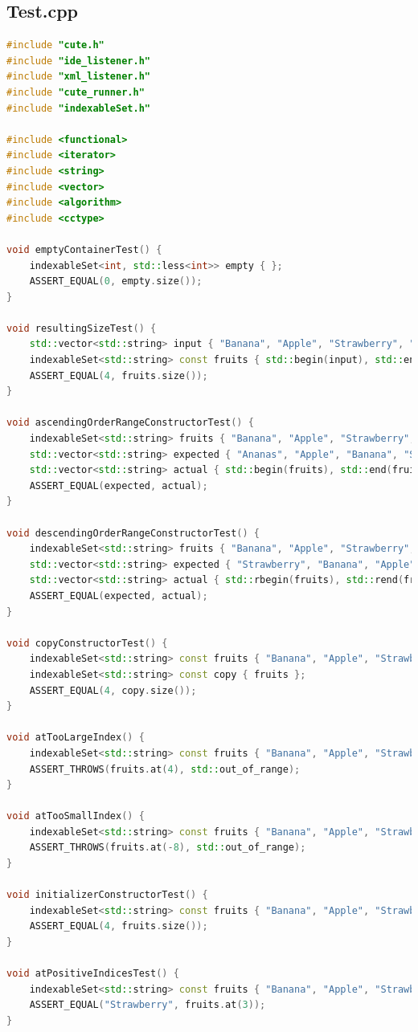 \subsection{Test.cpp}
\begin{lstlisting}[language=C++]
#include "cute.h"
#include "ide_listener.h"
#include "xml_listener.h"
#include "cute_runner.h"
#include "indexableSet.h"

#include <functional>
#include <iterator>
#include <string>
#include <vector>
#include <algorithm>
#include <cctype>

void emptyContainerTest() {
	indexableSet<int, std::less<int>> empty { };
	ASSERT_EQUAL(0, empty.size());
}

void resultingSizeTest() {
	std::vector<std::string> input { "Banana", "Apple", "Strawberry", "Ananas" };
	indexableSet<std::string> const fruits { std::begin(input), std::end(input) };
	ASSERT_EQUAL(4, fruits.size());
}

void ascendingOrderRangeConstructorTest() {
	indexableSet<std::string> fruits { "Banana", "Apple", "Strawberry", "Ananas" };
	std::vector<std::string> expected { "Ananas", "Apple", "Banana", "Strawberry" };
	std::vector<std::string> actual { std::begin(fruits), std::end(fruits) };
	ASSERT_EQUAL(expected, actual);
}

void descendingOrderRangeConstructorTest() {
	indexableSet<std::string> fruits { "Banana", "Apple", "Strawberry", "Ananas" };
	std::vector<std::string> expected { "Strawberry", "Banana", "Apple", "Ananas" };
	std::vector<std::string> actual { std::rbegin(fruits), std::rend(fruits) };
	ASSERT_EQUAL(expected, actual);
}

void copyConstructorTest() {
	indexableSet<std::string> const fruits { "Banana", "Apple", "Strawberry", "Ananas" };
	indexableSet<std::string> const copy { fruits };
	ASSERT_EQUAL(4, copy.size());
}

void atTooLargeIndex() {
	indexableSet<std::string> const fruits { "Banana", "Apple", "Strawberry", "Ananas" };
	ASSERT_THROWS(fruits.at(4), std::out_of_range);
}

void atTooSmallIndex() {
	indexableSet<std::string> const fruits { "Banana", "Apple", "Strawberry", "Ananas" };
	ASSERT_THROWS(fruits.at(-8), std::out_of_range);
}

void initializerConstructorTest() {
	indexableSet<std::string> const fruits { "Banana", "Apple", "Strawberry", "Ananas" };
	ASSERT_EQUAL(4, fruits.size());
}

void atPositiveIndicesTest() {
	indexableSet<std::string> const fruits { "Banana", "Apple", "Strawberry", "Ananas" };
	ASSERT_EQUAL("Strawberry", fruits.at(3));
}


\end{lstlisting}
